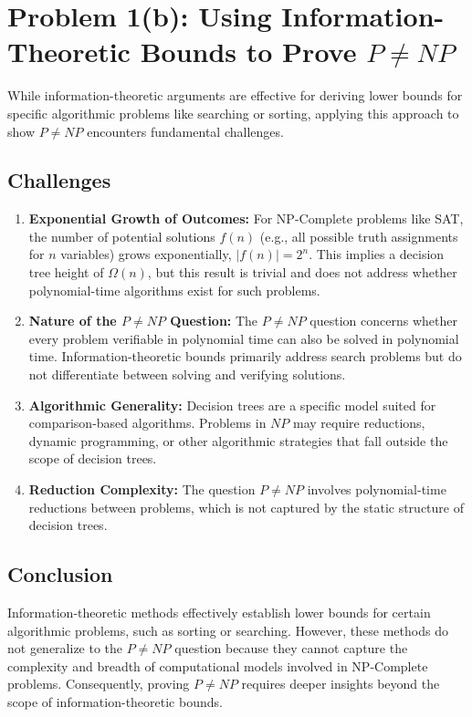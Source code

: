 \documentclass[12pt]{article}
\begin{document}
\section*{Problem 1(b): Using Information-Theoretic Bounds to Prove \(P \neq NP\)}

While information-theoretic arguments are effective for deriving lower bounds for specific algorithmic problems like searching or sorting, applying this approach to show \(P \neq NP\) encounters fundamental challenges.

\subsection*{Challenges}
\begin{enumerate}
    \item \textbf{Exponential Growth of Outcomes:} For NP-Complete problems like SAT, the number of potential solutions \(f(n)\) (e.g., all possible truth assignments for \(n\) variables) grows exponentially, \(|f(n)| = 2^n\). This implies a decision tree height of \(\Omega(n)\), but this result is trivial and does not address whether polynomial-time algorithms exist for such problems.
    \item \textbf{Nature of the \(P \neq NP\) Question:} The \(P \neq NP\) question concerns whether every problem verifiable in polynomial time can also be solved in polynomial time. Information-theoretic bounds primarily address search problems but do not differentiate between solving and verifying solutions.
    \item \textbf{Algorithmic Generality:} Decision trees are a specific model suited for comparison-based algorithms. Problems in \(NP\) may require reductions, dynamic programming, or other algorithmic strategies that fall outside the scope of decision trees.
    \item \textbf{Reduction Complexity:} The question \(P \neq NP\) involves polynomial-time reductions between problems, which is not captured by the static structure of decision trees.
\end{enumerate}

\subsection*{Conclusion}
Information-theoretic methods effectively establish lower bounds for certain algorithmic problems, such as sorting or searching. However, these methods do not generalize to the \(P \neq NP\) question because they cannot capture the complexity and breadth of computational models involved in NP-Complete problems. Consequently, proving \(P \neq NP\) requires deeper insights beyond the scope of information-theoretic bounds.
\end{document}
